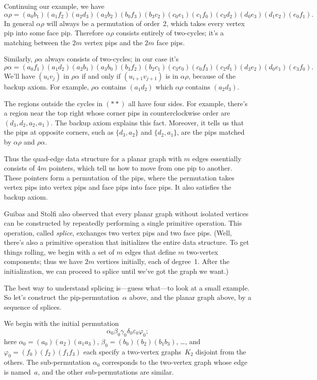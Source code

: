 Continuing our example, we have
$$\alpha\rho=
(a_0b_1)(a_1f_2)(a_2d_3)(a_3b_2)(b_0f_3)(b_3c_2)
(c_0e_1)(c_1f_0)(c_3d_2)(d_0e_3)(d_1e_2)(e_0f_1).$$
In general $\alpha\rho$ will always be
a permutation of order~2, which takes every vertex pip into some face pip.
Therefore $\alpha\rho$ consists entirely of two-cycles; it's a matching
between the $2m$ vertex pips and the $2m$ face pips.

Similarly, $\rho\alpha$ always consists of two-cycles; in our case it's
$$\rho\alpha=
(a_0f_1)(a_1d_2)(a_2b_1)(a_3b_0)(b_3f_2)(b_2c_1)
(c_3e_0)(c_0f_3)(c_2d_1)(d_3e_2)(d_0e_1)(e_3f_0).$$
We'll have $(u_iv_j)$ in $\rho\alpha$ if and only if $(u_{i+1}v_{j+1})$
is in $\alpha\rho$, because of the backup axiom. For example,
$\rho\alpha$ contains $(a_1d_2)$ which $\alpha\rho$ contains $(a_2d_3)$.

The regions outside the cycles in $(**)$ all have four sides. For example,
there's a region near the top right whose corner pips in counterclockwise
order are $(d_3,d_2,a_2,a_1)$. The backup axiom explains this fact.
Moreover, it tells us that the
pips at opposite corners, such as $\{d_3,a_2\}$ and $\{d_2,a_1\}$, are the
pips matched by $\alpha\rho$ and $\rho\alpha$.

\fi

Thus the quad-edge data structure for a planar
graph with $m$ edges
essentially consists of $4m$ pointers, which tell us how to move
from one pip to another. These pointers form a permutation of the
pips, where the permutation takes vertex pips into vertex pips and
face pips into face pips. It also satisfies the backup axiom.

Guibas and Stolfi also observed that every planar graph without
isolated vertices can be constructed
by repeatedly performing a single primitive operation.
This operation, called {\it splice},
exchanges two vertex pips and two face pips. (Well, there's
also a primitive operation that initializes the entire data structure.
To get things rolling, we begin with
a set of $m$ edges that define $m$ two-vertex components;
thus we have $2m$ vertices initially, each of degree~1.
After the initialization, we can proceed to splice until we've got the
graph we want.)

The best way to understand splicing is---guess what---to look at
a small example. So let's construct the pip-permutation~$\alpha$
above, and the planar graph above, by a sequence of splices.

We begin with the initial permutation
$$\alpha_0\beta_0\gamma_0\delta_0\varepsilon_0\varphi_0;$$
here $\alpha_0=(a_0)(a_2)(a_1a_3)$,
$\beta_0=(b_0)(b_2)(b_1b_3)$, \dots, and
$\varphi_0=(f_0)(f_2)(f_1f_3)$
each specify a two-vertex graphs~$K_2$ disjoint from the others.
The sub-permutation $\alpha_0$ corresponds to the two-vertex
graph whose edge is named~$a$, and the other sub-permutations are similar.

